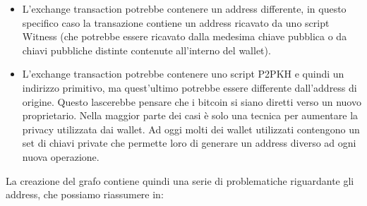 \begin{itemize}
  \item L’exchange transaction potrebbe contenere un address differente, in questo specifico caso la transazione contiene un address ricavato da uno script Witness (che potrebbe essere ricavato dalla medesima chiave pubblica o da chiavi pubbliche distinte contenute all’interno del wallet).

  \item L'exchange transaction potrebbe contenere uno script P2PKH e quindi un indirizzo primitivo, ma quest’ultimo potrebbe essere differente dall’address di origine. Questo lascerebbe pensare che i bitcoin si siano diretti verso un nuovo proprietario.
  Nella maggior parte dei casi è solo una tecnica per aumentare la privacy utilizzata dai wallet.
  Ad oggi molti dei wallet utilizzati contengono un set di chiavi private che permette loro di generare un address diverso ad ogni nuova operazione.
\end{itemize}

La creazione del grafo contiene quindi una serie di problematiche riguardante gli address, che possiamo riassumere in:

